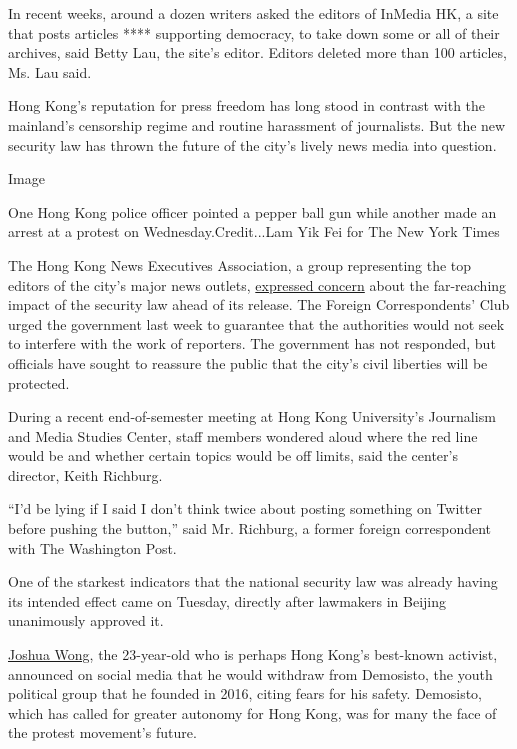 In recent weeks, around a dozen writers asked the editors of InMedia HK,
a site that posts articles **** supporting democracy, to take down some
or all of their archives, said Betty Lau, the site's editor. Editors
deleted more than 100 articles, Ms. Lau said.

Hong Kong's reputation for press freedom has long stood in contrast with
the mainland's censorship regime and routine harassment of journalists.
But the new security law has thrown the future of the city's lively news
media into question.

Image

One Hong Kong police officer pointed a pepper ball gun while another
made an arrest at a protest on Wednesday.Credit...Lam Yik Fei for The
New York Times

The Hong Kong News Executives Association, a group representing the top
editors of the city's major news outlets,
\href{https://www.scmp.com/news/hong-kong/law-and-crime/article/3090787/hong-kong-national-security-law-citys-media-bosses}{expressed
concern} about the far-reaching impact of the security law ahead of its
release. The Foreign Correspondents' Club urged the government last week
to guarantee that the authorities would not seek to interfere with the
work of reporters. The government has not responded, but officials have
sought to reassure the public that the city's civil liberties will be
protected.

During a recent end-of-semester meeting at Hong Kong University's
Journalism and Media Studies Center, staff members wondered aloud where
the red line would be and whether certain topics would be off limits,
said the center's director, Keith Richburg.

``I'd be lying if I said I don't think twice about posting something on
Twitter before pushing the button,'' said Mr. Richburg, a former foreign
correspondent with The Washington Post.

One of the starkest indicators that the national security law was
already having its intended effect came on Tuesday, directly after
lawmakers in Beijing unanimously approved it.

\href{https://www.nytimes.com/2014/10/02/world/asia/hong-kong-china-democracy-protests-students.html}{Joshua
Wong}, the 23-year-old who is perhaps Hong Kong's best-known activist,
announced on social media that he would withdraw from Demosisto, the
youth political group that he founded in 2016, citing fears for his
safety. Demosisto, which has called for greater autonomy for Hong Kong,
was for many the face of the protest movement's future.

